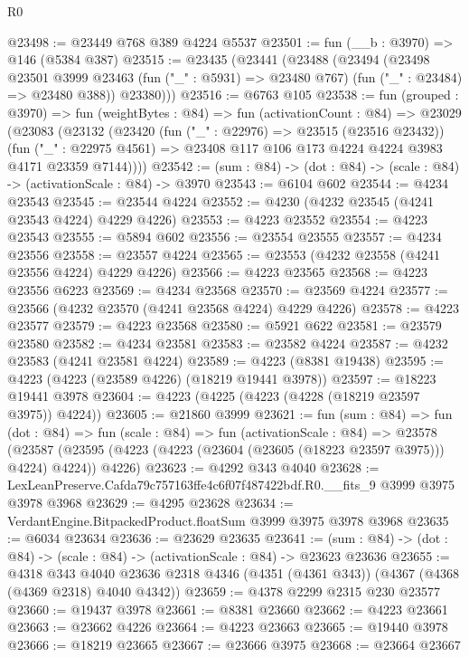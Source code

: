 \begin{lexlean}{R0}
\begin{coremodule}
@23498 := @23449 @768 @389 @4224 @5537
@23501 := fun (__b : @3970) => @146 (@5384 @387)
@23515 := @23435
    (@23441
      (@23488
        (@23494
          (@23498
            @23501
            @3999
            @23463
            (fun ("_" : @5931) => @23480 @767)
            (fun ("_" : @23484) => @23480 @388))
          @23380)))
@23516 := @6763 @105
@23538 := fun (grouped : @3970) =>
  fun (weightBytes : @84) =>
  fun (activationCount : @84) =>
  @23029
    (@23083
      (@23132
        (@23420
          (fun ("_" : @22976) => @23515 (@23516 @23432))
          (fun ("_" : @22975 @4561) =>
          @23408 @117 @106 @173 @4224 @4224 @3983 @4171 @23359 @7144))))
@23542 := (sum : @84) -> (dot : @84) -> (scale : @84) -> (activationScale : @84) -> @3970
@23543 := @6104 @602
@23544 := @4234 @23543
@23545 := @23544 @4224
@23552 := @4230 (@4232 @23545 (@4241 @23543 @4224) @4229 @4226)
@23553 := @4223 @23552
@23554 := @4223 @23543
@23555 := @5894 @602
@23556 := @23554 @23555
@23557 := @4234 @23556
@23558 := @23557 @4224
@23565 := @23553 (@4232 @23558 (@4241 @23556 @4224) @4229 @4226)
@23566 := @4223 @23565
@23568 := @4223 @23556 @6223
@23569 := @4234 @23568
@23570 := @23569 @4224
@23577 := @23566 (@4232 @23570 (@4241 @23568 @4224) @4229 @4226)
@23578 := @4223 @23577
@23579 := @4223 @23568
@23580 := @5921 @622
@23581 := @23579 @23580
@23582 := @4234 @23581
@23583 := @23582 @4224
@23587 := @4232 @23583 (@4241 @23581 @4224)
@23589 := @4223 (@8381 @19438)
@23595 := @4223 (@4223 (@23589 @4226) (@18219 @19441 @3978))
@23597 := @18223 @19441 @3978
@23604 := @4223 (@4225 (@4223 (@4228 (@18219 @23597 @3975)) @4224))
@23605 := @21860 @3999
@23621 := fun (sum : @84) =>
  fun (dot : @84) =>
  fun (scale : @84) =>
  fun (activationScale : @84) =>
  @23578 (@23587 (@23595 (@4223 (@4223 (@23604 (@23605 (@18223 @23597 @3975))) @4224) @4224)) @4226)
@23623 := @4292 @343 @4040
@23628 := LexLeanPreserve.Cafda79c757163ffe4c6f07f487422bdf.R0.__fits_9 @3999 @3975 @3978 @3968
@23629 := @4295 @23628
@23634 := VerdantEngine.BitpackedProduct.floatSum @3999 @3975 @3978 @3968
@23635 := @6034 @23634
@23636 := @23629 @23635
@23641 := (sum : @84) -> (dot : @84) -> (scale : @84) -> (activationScale : @84) -> @23623 @23636
@23655 := @4318
    @343
    @4040
    @23636
    @2318
    @4346
    (@4351 (@4361 @343))
    (@4367 (@4368 (@4369 @2318) @4040 @4342))
@23659 := @4378 @2299 @2315 @230 @23577
@23660 := @19437 @3978
@23661 := @8381 @23660
@23662 := @4223 @23661
@23663 := @23662 @4226
@23664 := @4223 @23663
@23665 := @19440 @3978
@23666 := @18219 @23665
@23667 := @23666 @3975
@23668 := @23664 @23667

\end{coremodule}
\end{lexlean}
